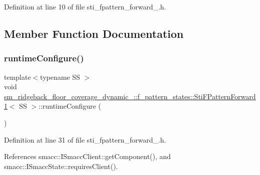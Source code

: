 Definition at line 10 of file sti\+\_\+fpattern\+\_\+forward\+\_.\+h.



\subsection{Member Function Documentation}
\mbox{\label{structsm__ridgeback__floor__coverage__dynamic__1_1_1f__pattern__states_1_1StiFPatternForward1_a94dfc62e04312989736f978186f8d3db}} 
\subsubsection{\texorpdfstring{runtime\+Configure()}{runtimeConfigure()}}
{\footnotesize\ttfamily template$<$typename SS $>$ \\
void \hyperlink{structsm__ridgeback__floor__coverage__dynamic__1_1_1f__pattern__states_1_1StiFPatternForward1}{sm\+\_\+ridgeback\+\_\+floor\+\_\+coverage\+\_\+dynamic\+\_\+::f\+\_\+pattern\+\_\+states\+::\+Sti\+F\+Pattern\+Forward1}$<$ SS $>$\+::runtime\+Configure (\begin{DoxyParamCaption}{ }\end{DoxyParamCaption})\hspace{0.3cm}{\ttfamily [inline]}}



Definition at line 31 of file sti\+\_\+fpattern\+\_\+forward\+\_.\+h.



References smacc\+::\+I\+Smacc\+Client\+::get\+Component(), and smacc\+::\+I\+Smacc\+State\+::requires\+Client().


